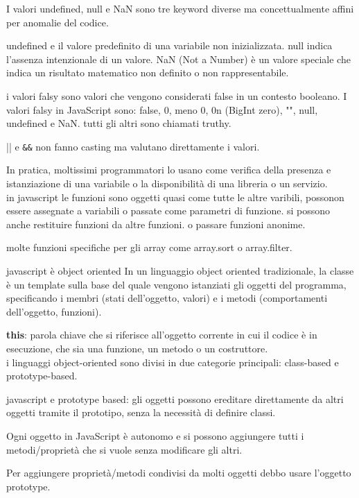 \documentclass[12pt]{article}
\begin{document}
I valori undefined, null e NaN sono tre keyword diverse ma concettualmente
affini per anomalie del codice.

undefined e il valore predefinito di una variabile non inizializzata. null indica l'assenza intenzionale di un valore.
NaN (Not a Number) è un valore speciale che indica un risultato matematico non definito o non rappresentabile.

i valori falsy sono valori che vengono considerati false in un contesto booleano. I valori falsy in JavaScript sono: false, 0,  meno 0, 0n (BigInt zero), "", null, undefined e NaN.
tutti gli altri sono chiamati truthy.

|| e \texttt{\&\&} non fanno casting ma valutano direttamente i valori.

In pratica, moltissimi programmatori lo usano come verifica della presenza e
istanziazione di una variabile o la disponibilità di una libreria o un servizio.\\

in javascript le funzioni sono oggetti quasi come tutte le altre varibili, possonon essere assegnate a variabili o passate come parametri di funzione.
si possono anche restituire funzioni da altre funzioni.
o passare funzioni anonime.

molte funzioni specifiche per gli array come array.sort o array.filter.

javascript è object oriented 
In un linguaggio object oriented tradizionale, la classe è un
template sulla base del quale vengono istanziati gli oggetti del
programma, specificando i membri (stati dell'oggetto, valori) e
i metodi (comportamenti dell'oggetto, funzioni).

\textbf{this}: parola chiave che si riferisce all'oggetto corrente in cui il codice è in esecuzione, che sia una funzione, un metodo o un costruttore.\\

i linguaggi object-oriented sono divisi in due categorie principali: class-based e prototype-based.

javascript e prototype based: gli oggetti possono ereditare direttamente da altri oggetti tramite il prototipo, senza la necessità di definire classi.

Ogni oggetto in JavaScript è autonomo e si possono
aggiungere tutti i metodi/proprietà che si vuole senza
modificare gli altri.

Per aggiungere proprietà/metodi condivisi da molti oggetti
debbo usare l'oggetto prototype.
\end{document}

